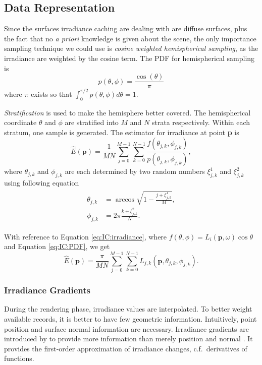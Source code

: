 \documentclass[]{book}
\begin{document}
\subsection{Data Representation}
\label{sec:IC:data:represent}
Since the surfaces irradiance caching are dealing with are diffuse surfaces, plus the fact that no \textit{a priori} knowledge is given about the scene, the only importance sampling technique we could use is \textit{cosine weighted hemispherical sampling}, as the irradiance are weighted by the cosine term.
The PDF for hemispherical sampling is
\begin{equation}
\label{eq:IC:PDF}
	p(\theta, \phi) = \frac{\cos(\theta)}{\pi}
\end{equation} 
where $\pi$ exists so that $\int_{0}^{\pi / 2}p(\theta, \phi)d\theta = 1$.

\textit{Stratification} is used to make the hemisphere better covered.
The hemispherical coordinate $\theta$ and $\phi$ are stratified into $M$ and $N$ strata respectively.
Within each stratum, one sample is generated.
The estimator for irradiance at point \textbf{p} is
\begin{equation*}
	\widehat{E}(\textbf{p}) = \frac{1}{MN} \sum_{j=0}^{M-1} \sum_{k=0}^{N-1} \frac{f(\theta_{j, k}, \phi_{j, k})}{p(\theta_{j, k}, \phi_{j, k})},
\end{equation*}
where $\theta_{j,k}$ and $\phi_{j,k}$ are each determined by two random numbers $\xi_{j, k}^{1}$ and $\xi_{j, k}^{2}$ using following equation
\begin{gather}
\label{eq:IC:hemisphericalCoord}
\begin{aligned}
	\theta_{j,k} &= \arccos \sqrt{1 - \frac{j + \xi_{j, k}^{1}}{M}}, \\
	\phi_{j,k} &= 2\pi\frac{k + \xi_{j, k}^{2}}{N}.
\end{aligned}
\end{gather}

With reference to Equation \ref{eq:IC:irradiance}, where $f(\theta, \phi) = L_i(\textbf{p}, \omega) \cos\theta$ and Equation \ref{eq:IC:PDF}, we get
\begin{equation}
\label{eq:IC:irradianceEstimator}
	\widehat{E}(\textbf{p}) = \frac{\pi}{MN} \sum_{j=0}^{M-1} \sum_{k=0}^{N-1} L_{j, k} (\textbf{p}, \theta_{j, k}, \phi_{j, k}).
\end{equation}

\subsubsection*{Irradiance Gradients}
During the rendering phase, irradiance values are interpolated.
To better weight available records, it is better to have few geometric information.
Intuitively, point position and surface normal information are necessary.
Irradiance gradients are introduced by \citeauthor{ward1992irradiance} to provide more information than merely position and normal \cite{ward1992irradiance}.
It provides the first-order approximation of irradiance changes, c.f.\ derivatives of functions.
\end{document}
